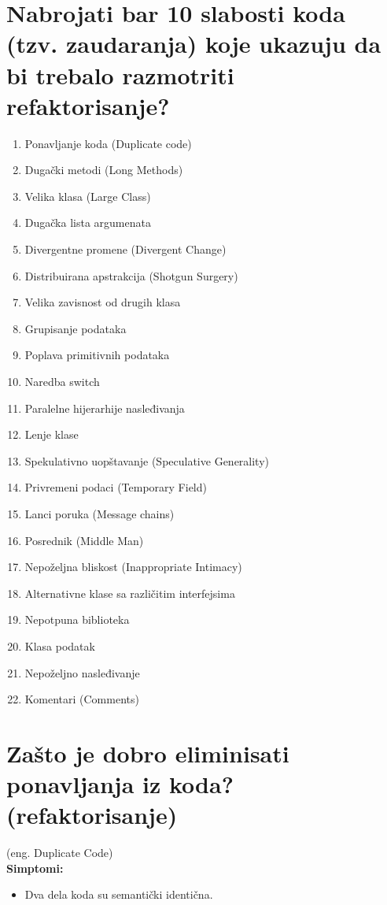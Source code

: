 \documentclass[a4paper]{article}
\begin{document}
\section{Nabrojati bar 10 slabosti koda (tzv. zaudaranja) 
         koje ukazuju da bi trebalo razmotriti refaktorisanje?} 
\begin{enumerate}
  \item Ponavljanje koda (Duplicate code)
  \item Dugački metodi (Long Methods)
  \item Velika klasa (Large Class)
  \item Dugačka lista argumenata
  \item Divergentne promene (Divergent Change)
  \item Distribuirana apstrakcija (Shotgun Surgery)
  \item Velika zavisnost od drugih klasa 
  \item Grupisanje podataka
  \item Poplava primitivnih podataka
  \item Naredba switch
  \item Paralelne hijerarhije nasleđivanja
  \item Lenje klase
  \item Spekulativno uopštavanje (Speculative Generality)
  \item Privremeni podaci (Temporary Field)
  \item Lanci poruka (Message chains)
  \item Posrednik (Middle Man)
  \item Nepoželjna bliskost (Inappropriate Intimacy)
  \item Alternativne klase sa različitim interfejsima
  \item Nepotpuna biblioteka
  \item Klasa podatak
  \item Nepoželjno nasleđivanje
  \item Komentari (Comments) \cite{rg_refactoring}
\end{enumerate}

\section{Zašto je dobro eliminisati ponavljanja iz koda? (refaktorisanje)}
  (eng. Duplicate Code)\\
  \textbf{Simptomi:}
  \begin{itemize}
    \item Dva dela koda su semantički identična.
  \end{itemize}
\end{document}
